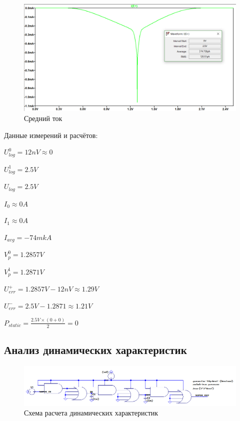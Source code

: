 \documentclass[a4paper,14pt]{article}
\begin{document}
\begin{figure}[H]
	\centering		
	\includegraphics[width=\linewidth]{image/dc_I_avg}
	\caption{Средний ток}\label{img:dc_I_avg}
\end{figure}

Данные измерений и расчётов:

$U_{log}^0 = 12 nV \approx 0$

$U_{log}^1 = 2.5 V$

$U_{log} = 2.5 V$

$I_0 \approx 0 A $

$I_1 \approx 0 A $

$I_{avg} = -74 mkA $

$V_p^0 = 1.2857V$

$V_p^1 = 1.2871V$

$U_{err}^{+} = 1.2857V - 12nV \approx 1.29V $

$U_{err}^{-} = 2.5V - 1.2871 \approx 1.21V $

$P_{static} = \frac{2.5V \times (0 + 0)}{2} = 0$

\subsection{Анализ динамических характеристик}

\begin{figure}[H]
	\centering
	\includegraphics[width=\linewidth]{image/dyn_shema_min}
	\caption{Схема расчета динамических характеристик}
	\label{fig:dynshema}
\end{figure}
\end{document}
